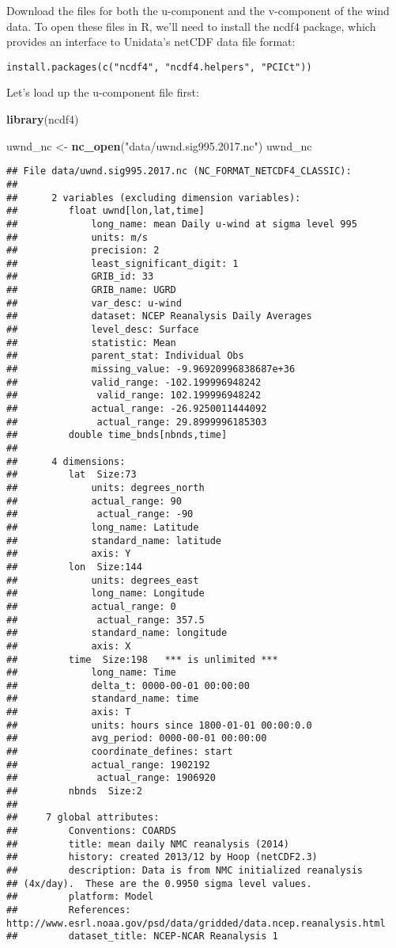 \documentclass[]{book}
\newenvironment{Shaded}{\begin{snugshade}}{\end{snugshade}}
\newcommand{\KeywordTok}[1]{\textcolor[rgb]{0.13,0.29,0.53}{\textbf{{#1}}}}
\newcommand{\StringTok}[1]{\textcolor[rgb]{0.31,0.60,0.02}{{#1}}}
\newcommand{\NormalTok}[1]{{#1}}
\begin{document}
Download the files for both the u-component and the v-component of the
wind data. To open these files in R, we'll need to install the ncdf4
package, which provides an interface to Unidata's netCDF data file
format:

\begin{verbatim}
install.packages(c("ncdf4", "ncdf4.helpers", "PCICt"))
\end{verbatim}

Let's load up the u-component file first:

\begin{Shaded}
\begin{Highlighting}[]
\KeywordTok{library}\NormalTok{(ncdf4)}

\NormalTok{uwnd_nc <-}\StringTok{ }\KeywordTok{nc_open}\NormalTok{(}\StringTok{"data/uwnd.sig995.2017.nc"}\NormalTok{)}
\NormalTok{uwnd_nc}
\end{Highlighting}
\end{Shaded}

\begin{verbatim}
## File data/uwnd.sig995.2017.nc (NC_FORMAT_NETCDF4_CLASSIC):
## 
##      2 variables (excluding dimension variables):
##         float uwnd[lon,lat,time]   
##             long_name: mean Daily u-wind at sigma level 995
##             units: m/s
##             precision: 2
##             least_significant_digit: 1
##             GRIB_id: 33
##             GRIB_name: UGRD
##             var_desc: u-wind
##             dataset: NCEP Reanalysis Daily Averages
##             level_desc: Surface
##             statistic: Mean
##             parent_stat: Individual Obs
##             missing_value: -9.96920996838687e+36
##             valid_range: -102.199996948242
##              valid_range: 102.199996948242
##             actual_range: -26.9250011444092
##              actual_range: 29.8999996185303
##         double time_bnds[nbnds,time]   
## 
##      4 dimensions:
##         lat  Size:73
##             units: degrees_north
##             actual_range: 90
##              actual_range: -90
##             long_name: Latitude
##             standard_name: latitude
##             axis: Y
##         lon  Size:144
##             units: degrees_east
##             long_name: Longitude
##             actual_range: 0
##              actual_range: 357.5
##             standard_name: longitude
##             axis: X
##         time  Size:198   *** is unlimited ***
##             long_name: Time
##             delta_t: 0000-00-01 00:00:00
##             standard_name: time
##             axis: T
##             units: hours since 1800-01-01 00:00:0.0
##             avg_period: 0000-00-01 00:00:00
##             coordinate_defines: start
##             actual_range: 1902192
##              actual_range: 1906920
##         nbnds  Size:2
## 
##     7 global attributes:
##         Conventions: COARDS
##         title: mean daily NMC reanalysis (2014)
##         history: created 2013/12 by Hoop (netCDF2.3)
##         description: Data is from NMC initialized reanalysis
## (4x/day).  These are the 0.9950 sigma level values.
##         platform: Model
##         References: http://www.esrl.noaa.gov/psd/data/gridded/data.ncep.reanalysis.html
##         dataset_title: NCEP-NCAR Reanalysis 1
\end{verbatim}
\end{document}
